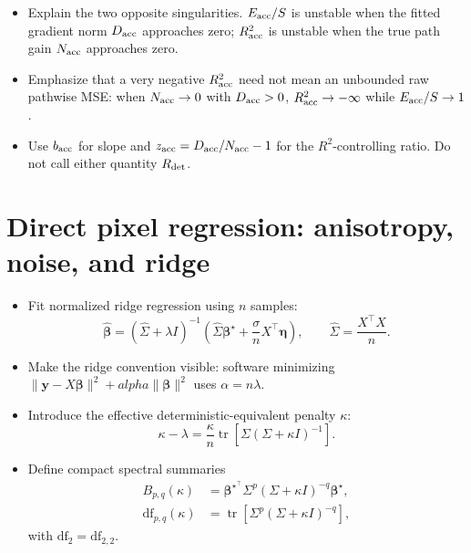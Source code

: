 \documentclass[11pt]{article}
\newcommand{\tr}{\operatorname{tr}}
\newcommand{\bhat}{\widehat{\bm\beta}}
\newcommand{\bstar}{\bm\beta^{\star}}
\begin{document}
\begin{itemize}
  \item Explain the two opposite singularities. $E_{\rm acc}/S$ is unstable
        when the fitted gradient norm $D_{\rm acc}$ approaches zero;
        $R_{\rm acc}^{2}$ is unstable when the true path gain
        $N_{\rm acc}$ approaches zero.
  \item Emphasize that a very negative $R_{\rm acc}^{2}$ need not mean an
        unbounded raw pathwise MSE: when $N_{\rm acc}\to0$ with
        $D_{\rm acc}>0$, $R_{\rm acc}^{2}\to-\infty$ while
        $E_{\rm acc}/S\to1$.
  \item Use $b_{\rm acc}$ for slope and
        $z_{\rm acc}=D_{\rm acc}/N_{\rm acc}-1$ for the $R^2$-controlling
        ratio. Do not call either quantity $R_{\rm det}$.
\end{itemize}

\section{Direct pixel regression: anisotropy, noise, and ridge}
\label{sec:pixel-ridge}

\begin{itemize}
  \item Fit normalized ridge regression using $n$ samples:
  \begin{equation}
    \bhat
    =(\widehat\Sigma+\lambda I)^{-1}
      \left(\widehat\Sigma\bstar+
      \frac{\sigma}{n}X^{\top}\bm\eta\right),
    \qquad \widehat\Sigma=\frac{X^{\top}X}{n}.
    \label{eq:pixel-ridge}
  \end{equation}
  \item Make the ridge convention visible: software minimizing
        $\lVert\bm y-X\bm\beta\rVert^2+alpha\lVert\bm\beta\rVert^2$
        uses $\alpha=n\lambda$.
  \item Introduce the effective deterministic-equivalent penalty $\kappa$:
  \begin{equation}
    \kappa-\lambda
      =\frac{\kappa}{n}\tr\!\left[
       \Sigma(\Sigma+\kappa I)^{-1}\right].
    \label{eq:kappa-fixed-point}
  \end{equation}
  \item Define compact spectral summaries
  \begin{align}
    B_{p,q}(\kappa)
      &=\bstar^{\top}\Sigma^p(\Sigma+\kappa I)^{-q}\bstar,\\
    \mathrm{df}_{p,q}(\kappa)
      &=\tr\!\left[\Sigma^p(\Sigma+\kappa I)^{-q}\right],
  \end{align}
  with $\mathrm{df}_{2}=\mathrm{df}_{2,2}$.
\end{itemize}
\end{document}
